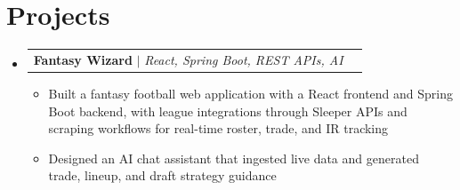 \documentclass[letterpaper,11pt]{article}
\makeatletter
\newcommand{\resumeItem}[1]{
  \item\small{
    {#1 \vspace{-1pt}}
  }
}
\newcommand{\resumeProjectHeading}[2]{
    \item
    \begin{tabular*}{0.97\textwidth}{l@{\extracolsep{\fill}}r}
      \small#1 & #2 \\
    \end{tabular*}\vspace{-7pt}
}
\newcommand{\resumeSubHeadingListStart}{\begin{itemize}[leftmargin=0.15in, label={}]}
\newcommand{\resumeSubHeadingListEnd}{\end{itemize}}
\newcommand{\resumeItemListStart}{\begin{itemize}[leftmargin=0.18in,itemsep=1pt,topsep=2pt]}
\newcommand{\resumeItemListEnd}{\end{itemize}\vspace{-5pt}}
\makeatother
\begin{document}
%
\section{Projects}
    \resumeSubHeadingListStart
      \resumeProjectHeading
          {\textbf{Fantasy Wizard} $|$ \emph{React, Spring Boot, REST APIs, AI}}{}
          \resumeItemListStart
            \resumeItem{Built a fantasy football web application with a React frontend and Spring Boot backend, with league integrations through Sleeper APIs and scraping workflows for real-time roster, trade, and IR tracking}
            \resumeItem{Designed an AI chat assistant that ingested live data and generated trade, lineup, and draft strategy guidance}
          \resumeItemListEnd
    \resumeSubHeadingListEnd

\end{document}
